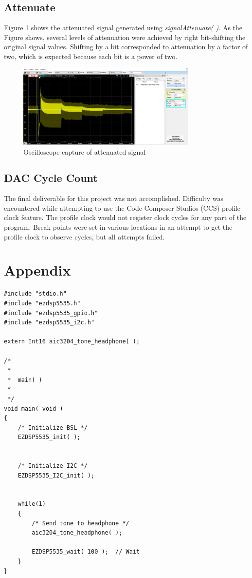 \documentclass[11pt,pdftex,portrait,letterpaper]{article}
\begin{document}
\subsection{Attenuate}

Figure \ref{f:fig5} shows the attenuated signal generated using \textit{signalAttenuate( )}. As the Figure shows, several levels of attenuation were achieved by right bit-shifting the original signal values. Shifting by a bit corresponded to attenuation by a factor of two, which is expected because each bit is a power of two. 

\begin{figure}[h]
\centering
\includegraphics[width=0.8\textwidth]{./attenuate}
\caption{Oscilloscope capture of attenuated signal}
\label{f:fig5}
\end{figure}

\subsection{DAC Cycle Count}

The final deliverable for this project was not accomplished. Difficulty was encountered while attempting to use the Code Composer Studios (CCS) profile clock feature. The profile clock would not register clock cycles for any part of the program. Break points were set in various locations in an attempt to get the profile clock to observe cycles, but all attempts failed.

\pagebreak

\section{Appendix}

\begin{lstlisting}[caption={main}, label=l:main]
#include "stdio.h"
#include "ezdsp5535.h"
#include "ezdsp5535_gpio.h"
#include "ezdsp5535_i2c.h"

extern Int16 aic3204_tone_headphone( );

/*
 *
 *  main( )
 *
 */
void main( void )
{
    /* Initialize BSL */
    EZDSP5535_init( );


    /* Initialize I2C */
    EZDSP5535_I2C_init( );


    while(1)
    {
        /* Send tone to headphone */
        aic3204_tone_headphone( );

        EZDSP5535_wait( 100 );  // Wait
    }
}
\end{lstlisting}
\end{document}

